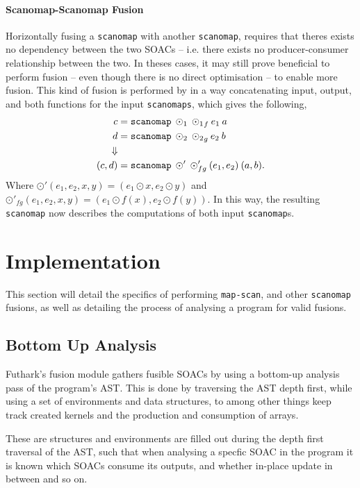 \documentclass[11pt]{article}
\begin{document}
\paragraph{Scanomap-Scanomap Fusion} Horizontally fusing a \texttt{scanomap} with another \texttt{scanomap}, requires that theres exists no dependency between the
 two SOACs -- i.e. there exists no producer-consumer relationship between the two. In theses cases, it may still prove beneficial to perform fusion -- even though there is no direct
 optimisation -- to enable more fusion.
This kind of fusion is performed by in a way concatenating input, output, and both functions for the input \texttt{scanomaps}, which gives the following,
\begin{align*}
  c &= \mathtt{scanomap} \: \odot_1 \: {\odot_1}_f \: e_1 \: a \\
  d &= \mathtt{scanomap} \: \odot_2 \: {\odot_2}_g \: e_2 \: b \\
\Downarrow \\
  (c,d) &= \mathtt{scanomap} \: \odot' \: \odot'_{fg} \: (e_1, e_2) \: (a, b)\mathnormal{.}
\end{align*}
Where $\odot'(e_1,e_2, x, y) = (e_1 \odot x, e_2 \odot y)$ and $\odot'_{fg}(e_1, e_2, x, y) = (e_1 \odot f(x), e_2 \odot f(y))$. In this way, the resulting \texttt{scanomap}
 now describes the computations of both input \texttt{scanomap}s.
\section{Implementation}
This section will detail the specifics of performing \texttt{map-scan}, and other \texttt{scanomap} fusions, as well as detailing the process of
 analysing a program for valid fusions.
\subsection{Bottom Up Analysis}
Futhark's fusion module gathers fusible SOACs by using a bottom-up analysis pass of the program's AST. This is done by traversing the AST depth first, while using a set
 of environments and data structures, to among other things keep track created kernels and the production and consumption of arrays. \cite{T2Fusion}

These are structures and environments are filled out during the depth first traversal of the AST, such that when analysing a specfic SOAC in the program it is known which
 SOACs consume its outputs, and whether in-place update in between and so on.
\end{document}

